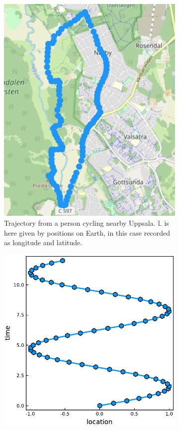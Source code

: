 \documentclass[12pt]{article}
\newcommand{\locset}{\mathbb{L}}
\theoremstyle{definition}
\begin{document}
\begin{figure}
  \centering
  \begin{subfigure}[t]{0.45\textwidth}
    \includegraphics[width=\textwidth]{figures/trajectory-uppsala.png}
    \caption{Trajectory from a person cycling nearby Uppsala.
      \(\locset\) is here given by positions on Earth, in this case
      recorded as longitude and latitude.}
    \label{fig:trajectory-uppsala}
  \end{subfigure}
  \begin{subfigure}[t]{0.45\textwidth}
    \includegraphics[width=\textwidth]{figures/trajectory_tempospatial.pdf}

\end{subfigure}
\end{figure}
\end{document}
